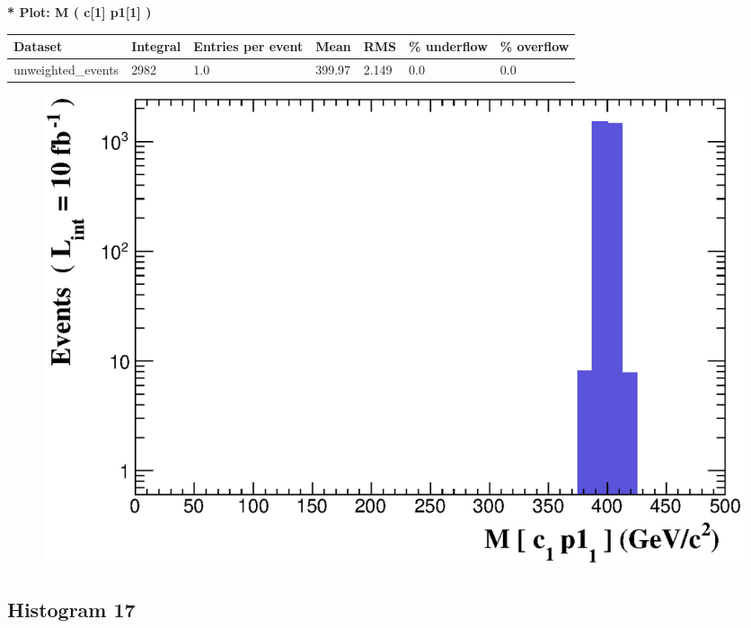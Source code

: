 \documentclass[a4paper, 10pt]{article}
\begin{document}
\textbf{* Plot: M ( c[1] p1[1] ) }\\
   \begin{table}[H]
  \begin{center}
    \begin{tabular}{|m{23.0mm}|m{23.0mm}|m{18.0mm}|m{19.0mm}|m{19.0mm}|m{19.0mm}|m{19.0mm}|}
      \hline
      {\cellcolor{yellow}         Dataset}& {\cellcolor{yellow}         Integral}& {\cellcolor{yellow}         Entries per event}& {\cellcolor{yellow}         Mean}& {\cellcolor{yellow}         RMS}& {\cellcolor{yellow}         \% underflow}& {\cellcolor{yellow}         \% overflow}\\
      \hline
      {\cellcolor{white}         unweighted\_events}& {\cellcolor{white}         2982}& {\cellcolor{white}         1.0}& {\cellcolor{white}         399.97}& {\cellcolor{white}         2.149}& {\cellcolor{green}         0.0}& {\cellcolor{green}         0.0}\\
\hline
    \end{tabular}
  \end{center}
\end{table}

\begin{figure}[H]
  \begin{center}
    \includegraphics[scale=0.45]{selection_15.eps}\\
\caption{   }
  \end{center}
\end{figure}
      \newpage
\subsection{ Histogram 17}
\end{document}

